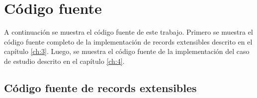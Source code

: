 
\appendix

\chapter{Código fuente}
\label{ch:7}

A continuación se muestra el código fuente de este trabajo. Primero se muestra el código fuente completo de la implementación de records extensibles descrito en el capítulo \ref{ch:3}. Luego, se muestra el código fuente de la implementación del caso de estudio descrito en el capítulo \ref{ch:4}.

\section{Código fuente de records extensibles}

